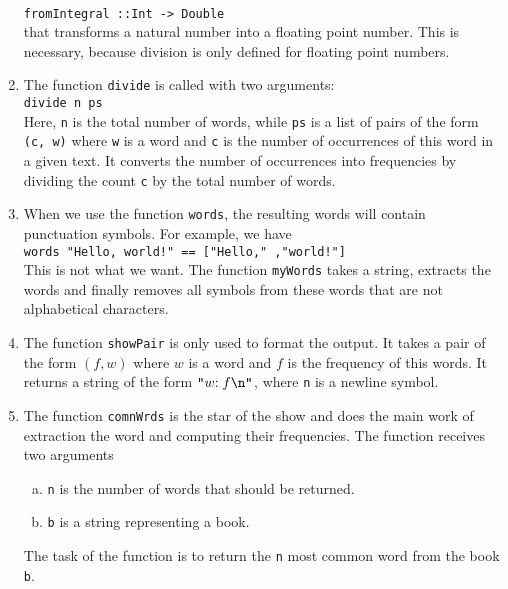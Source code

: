 \begin{enumerate}
      \\[0.2cm]
      \hspace*{1.3cm}
      \texttt{fromIntegral ::\;Int -> Double}
      \\[0.2cm]
      that transforms a natural number into a floating point number.  This is necessary, because division is
      only defined for floating point numbers.
\item The function \texttt{divide} is called with two arguments:
      \\[0.2cm]
      \hspace*{1.3cm}
      \texttt{divide n ps}
      \\[0.2cm]
      Here, \texttt{n} is the total number of words, while \texttt{ps} is a list of pairs of the form
      \texttt{(c, w)} where \texttt{w} is a word and \texttt{c} is the number of occurrences of this word in a
      given text.  It converts the number of occurrences into frequencies by dividing the count \texttt{c} by
      the total number of words.     
\item When we use the function \texttt{words}, the resulting words will contain punctuation symbols.  For
      example, we have
      \\[0.2cm]
      \hspace*{1.3cm}
      \texttt{words "Hello, world!" == ["Hello," ,"world!"]}
      \\[0.2cm]
      This is not what we want.  The function \texttt{myWords} takes a string, extracts the words and finally removes
      all symbols from these words that are not alphabetical characters.
\item The function \texttt{showPair} is only used to format the output.  It takes a pair of the form
      $(f, w)$ where $w$ is a word and $f$ is the frequency of this words.  It returns a string of the form 
      $\texttt{\symbol{34}}w\mathtt{:}\; f\texttt{\symbol{92}n\symbol{34}}$, where
      \texttt{n} is a newline symbol.
\item The function \texttt{comnWrds} is the star of the show and does the main work of extraction the word and
      computing their frequencies. The function receives two arguments
      \begin{enumerate}[(a)]
      \item \texttt{n} is the number of words that should be returned.
      \item \texttt{b} is a string representing a book.
      \end{enumerate}
      The task of the function is to return the \texttt{n} most common word from the book \texttt{b}.


\end{enumerate}
